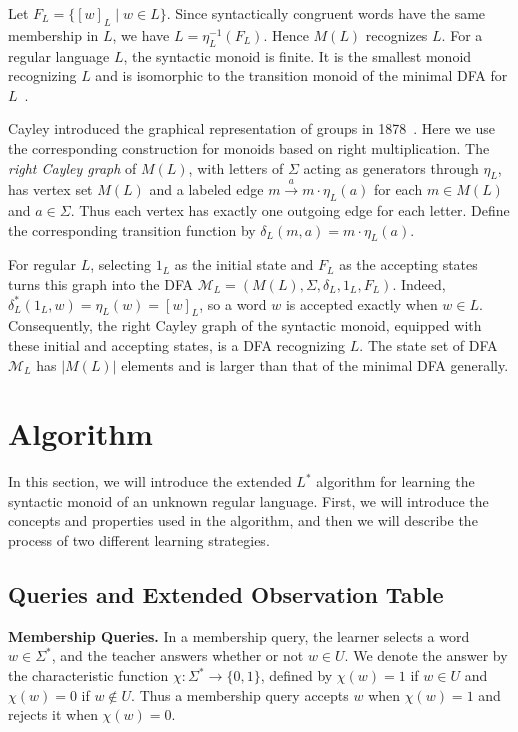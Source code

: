 \documentclass{ieice-tecrep}
\begin{document}
Let \(F_L=\{[w]_L\mid w\in L\}\). Since syntactically congruent
words have the same membership in \(L\), we have \(L=\eta_L^{-1}(F_L)\). Hence \(M(L)\) recognizes \(L\).
For a regular language \(L\), the syntactic monoid is finite. It is the
smallest monoid recognizing \(L\) and is isomorphic to the
transition monoid of the minimal DFA for \(L\)~\cite{holzer2004deterministic}.

Cayley introduced the graphical representation of groups in
1878~\cite{cayley1878graphical}. Here we use the corresponding
construction for monoids based on right multiplication.
The \emph{right Cayley graph} of \(M(L)\), with letters of \(\Sigma\)
acting as generators through \(\eta_L\), has vertex set \(M(L)\)
and a labeled edge
\(m\xrightarrow{a}m\cdot\eta_L(a)\) for each \(m\in M(L)\)
and \(a\in\Sigma\). Thus each vertex has exactly one outgoing
edge for each letter. Define the corresponding transition function
by \(\delta_L(m,a)=m\cdot\eta_L(a)\).

For regular \(L\), selecting \(1_L\) as the initial state and
\(F_L\) as the accepting states turns this graph into the DFA
\(\mathcal{M}_L=(M(L),\Sigma,\delta_L,1_L,F_L)\).
Indeed, \(\delta_L^*(1_L,w)=\eta_L(w)=[w]_L\), so a word
\(w\) is accepted exactly when \(w\in L\).
Consequently, the right Cayley graph of the syntactic monoid,
equipped with these initial and accepting states, is a DFA
recognizing \(L\). The state set of DFA \(\mathcal{M}_L\) has \(|M(L)|\) elements and is larger than that of the minimal DFA generally.

\section{Algorithm}\label{algorithm}

In this section, we will introduce the extended \(L^*\) algorithm for learning the syntactic monoid of an unknown regular language.
First, we will introduce the concepts and properties used in the algorithm, and then we will describe the process of two different learning strategies.

\subsection{Queries and Extended Observation Table}\label{algorithm-concepts}
\textbf{Membership Queries.} In a membership query, the learner selects a word \(w \in \Sigma^*\), and the teacher answers whether or not \(w \in U\).
We denote the answer by the characteristic function
\(\chi:\Sigma^*\to\{0,1\}\), defined by \(\chi(w)= 1\) if \(w\in U\) and \(\chi(w)=0\) if \(w\notin U\).
Thus a membership query accepts \(w\) when \(\chi(w)=1\) and
rejects it when \(\chi(w)=0\).
\end{document}
